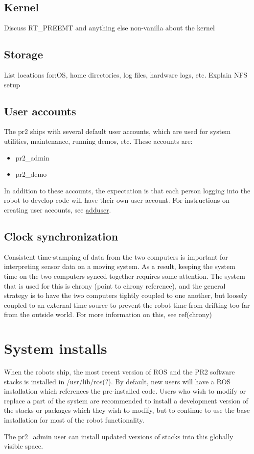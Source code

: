 \subsection{Kernel}
Discuss RT\_PREEMT and anything else non-vanilla about the kernel
\subsection{Storage}
List locations for:OS, home directories, log files, hardware logs, etc.  Explain NFS setup
\subsection{User accounts}
The pr2 ships with several default user accounts, which are used for system utilities, maintenance, running demos, etc.  These accounts are:
\begin{itemize}
\item{pr2\_admin}
\item{pr2\_demo}
\end{itemize}
In addition to these accounts, the expectation is that each person logging into the robot to develop code will have their own user account.  For instructions on creating user accounts, see \href{http://ss64.com/bash/useradd.html}{adduser}.
\subsection{Clock synchronization}
Consistent time-stamping of data from the two computers is important for interpreting sensor data on a moving system.
As a result, keeping the system time on the two computers synced together requires some attention.  The system that is used for this is chrony (point to chrony reference), and the general strategy is to have the two computers tightly coupled to one another, but loosely coupled to an external time source to prevent the robot time from drifting too far from the outside world.  For more information on this, see ref(chrony)
\section{System installs}
When the robots ship, the most recent version of ROS and the PR2 software stacks is installed in /usr/lib/ros(?).  By default, new users will have a ROS installation which references the pre-installed code.  Users who wish to modify or replace a part of the system are recommended to install a development version of the stacks or packages which they wish to modify, but to continue to use the base installation for most of the robot functionality.

The pr2\_admin user can install updated versions of stacks into this globally visible space.


